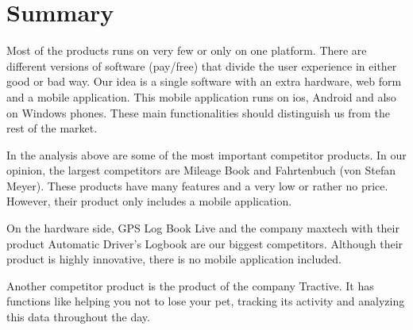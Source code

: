 \section{Summary}
Most of the products runs on very few or only on one platform. There are different versions of software (pay/free)  that divide the user experience in either good or bad way. Our idea is a single software with an extra hardware, web form and a mobile application. This mobile application runs on \gls{ios}, Android and also on Windows phones. These main functionalities should distinguish us from the rest of the market.

In the analysis above are some of the most important competitor products. In our opinion, the largest competitors are Mileage Book and Fahrtenbuch (von Stefan Meyer). These products have many features and a very low or rather no price. However, their product only includes a mobile application.

On the hardware side, GPS Log Book Live and the company maxtech with their product Automatic Driver’s Logbook are our biggest competitors. Although their product is highly innovative, there is no mobile application included. 

Another competitor product is the product of the company Tractive. It has functions like helping you not to lose your pet, tracking its activity and analyzing this data throughout the day. 

